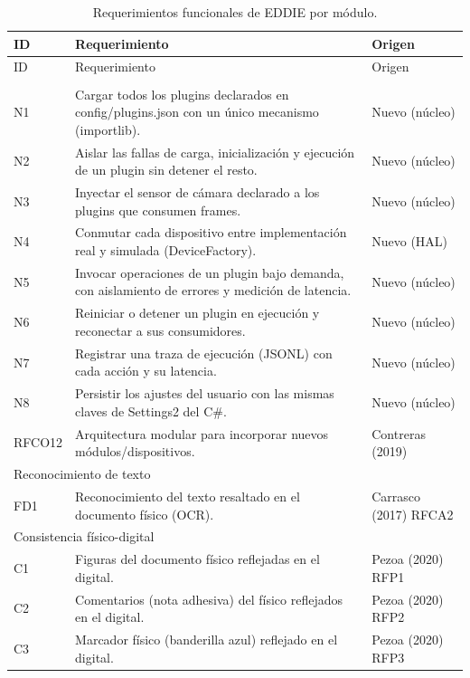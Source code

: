 \begin{longtable}{p{2.1cm} p{8.6cm} p{3.6cm}}
\caption{Requerimientos funcionales de EDDIE por módulo.}\label{tab:rf}\\
\toprule ID & Requerimiento & Origen \\ \midrule \endfirsthead
\toprule ID & Requerimiento & Origen \\ \midrule \endhead
\bottomrule \endfoot
\multicolumn{3}{l}{Núcleo y orquestador} \\
N1 & Cargar todos los plugins declarados en config/plugins.json con un único mecanismo (importlib). & Nuevo (núcleo) \\
N2 & Aislar las fallas de carga, inicialización y ejecución de un plugin sin detener el resto. & Nuevo (núcleo) \\
N3 & Inyectar el sensor de cámara declarado a los plugins que consumen frames. & Nuevo (núcleo) \\
N4 & Conmutar cada dispositivo entre implementación real y simulada (DeviceFactory). & Nuevo (HAL) \\
N5 & Invocar operaciones de un plugin bajo demanda, con aislamiento de errores y medición de latencia. & Nuevo (núcleo) \\
N6 & Reiniciar o detener un plugin en ejecución y reconectar a sus consumidores. & Nuevo (núcleo) \\
N7 & Registrar una traza de ejecución (JSONL) con cada acción y su latencia. & Nuevo (núcleo) \\
N8 & Persistir los ajustes del usuario con las mismas claves de Settings2 del C\#. & Nuevo (núcleo) \\
RFCO12 & Arquitectura modular para incorporar nuevos módulos/dispositivos. & Contreras (2019) \\
\midrule
\multicolumn{3}{l}{Reconocimiento de texto} \\
FD1 & Reconocimiento del texto resaltado en el documento físico (OCR). & Carrasco (2017) RFCA2 \\
\midrule
\multicolumn{3}{l}{Consistencia físico-digital} \\
C1 & Figuras del documento físico reflejadas en el digital. & Pezoa (2020) RFP1 \\
C2 & Comentarios (nota adhesiva) del físico reflejados en el digital. & Pezoa (2020) RFP2 \\
C3 & Marcador físico (banderilla azul) reflejado en el digital. & Pezoa (2020) RFP3 \\

\end{longtable}
